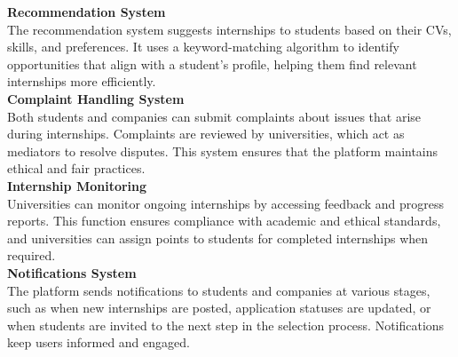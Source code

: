 \textbf{Recommendation System} \\
The recommendation system suggests internships to students based on their CVs, skills, and preferences. It uses a keyword-matching algorithm to identify opportunities that align with a student’s profile, helping them find relevant internships more efficiently. \\

\textbf{Complaint Handling System} \\
Both students and companies can submit complaints about issues that arise during internships. Complaints are reviewed by universities, which act as mediators to resolve disputes. This system ensures that the platform maintains ethical and fair practices. \\

\textbf{Internship Monitoring}\\
Universities can monitor ongoing internships by accessing feedback and progress reports. This function ensures compliance with academic and ethical standards, and universities can assign points to students for completed internships when required. \\

\textbf{Notifications System} \\
The platform sends notifications to students and companies at various stages, such as when new internships are posted, application statuses are updated, or when students are invited to the next step in the selection process. Notifications keep users informed and engaged. \\

